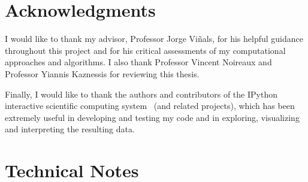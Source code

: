 \documentclass[english,letterpaper,12pt]{report}
\begin{document}
\begin{doublespacing}



\appendix

\chapter{Acknowledgments} %
\label{sec:acknowledgements}

I would like to thank my advisor, Professor Jorge Viñals, for his helpful guidance throughout this project and for his critical assessments of my computational approaches and algorithms. I also thank Professor Vincent Noireaux and Professor Yiannis Kaznessis for reviewing this thesis.

Finally, I would like to thank the authors and contributors of the IPython interactive scientific computing system~\cite{PER-GRA:2007} (and related projects), which has been extremely useful in developing and testing my code and in exploring, visualizing and interpreting the resulting data.

\chapter{Technical Notes} %
\label{sec:tech-notes}


\end{doublespacing}



\end{document}
